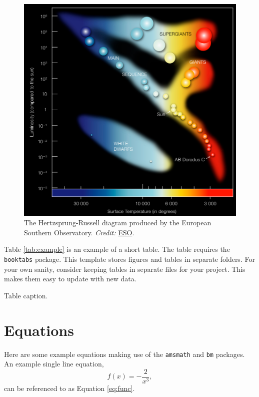 \begin{figure}[t]
  \centering
  \includegraphics{figures/example.pdf}
  \caption[Short version of caption]{The Hertzsprung-Russell diagram produced by the European Southern Observatory. \emph{Credit:} \href{https://www.eso.org/public/images/eso0728c/}{ESO}.}
  \label{fig:example}
\end{figure}

Table \ref{tab:example} is an example of a short table. The table requires the \texttt{booktabs} package. This template stores figures and tables in separate folders. For your own sanity, consider keeping tables in separate files for your project. This makes them easy to update with new data.

\begin{table}
  \centering
  \caption[Short version of caption]{Table caption.}
  \label{tab:example}
  
\end{table}

\section{Equations}

Here are some example equations making use of the \texttt{amsmath} and \texttt{bm} packages. An example single line equation,
%
\begin{equation}
  f(x) = - \frac{2}{x^3},\label{eq:func}
\end{equation}
%
can be referenced to as Equation \ref{eq:func}. 

